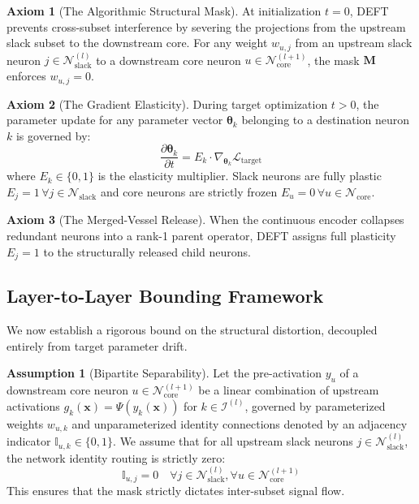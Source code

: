 \documentclass[11pt, a4paper, copyright, gdm]{google}
\newcommand{\xVect}{\boldsymbol{x}}
\newcommand{\thetaVect}{\boldsymbol{\theta}}
\newcommand{\calI}{\mathcal{I}}
\newcommand{\calL}{\mathcal{L}}
\newcommand{\calN}{\mathcal{N}}
\newcommand{\Mmat}{\boldsymbol{M}}
\theoremstyle{definition}
\newtheorem{axiom}{Axiom}
\newtheorem{assumption}{Assumption}
\begin{document}
\begin{axiom}[The Algorithmic Structural Mask]
\label{ax:structural_mask}
At initialization $t=0$, DEFT prevents cross-subset interference by severing the projections from the upstream slack subset to the downstream core. For any weight $w_{u,j}$ from an upstream slack neuron $j \in \calN^{(l)}_{\text{slack}}$ to a downstream core neuron $u \in \calN^{(l+1)}_{\text{core}}$, the mask $\Mmat$ enforces $w_{u,j} = 0$.
\end{axiom}

\begin{axiom}[The Gradient Elasticity]
\label{ax:gradient_scaling}
During target optimization $t>0$, the parameter update for any parameter vector $\thetaVect_k$ belonging to a destination neuron $k$ is governed by:
\begin{equation}
    \frac{\partial \thetaVect_k}{\partial t} = E_k \cdot \nabla_{\thetaVect_k} \calL_{\text{target}}
\end{equation}
where $E_k \in \{0, 1\}$ is the elasticity multiplier. Slack neurons are fully plastic $E_j = 1 \, \forall j \in \calN_{\text{slack}}$ and core neurons are strictly frozen $E_u = 0 \, \forall u \in \calN_{\text{core}}$.
\end{axiom}

\begin{axiom}[The Merged-Vessel Release]
\label{ax:merge_constraint}
When the continuous encoder collapses redundant neurons into a rank-1 parent operator, DEFT assigns full plasticity $E_j = 1$ to the structurally released child neurons.
\end{axiom}

\subsection{Layer-to-Layer Bounding Framework}
We now establish a rigorous bound on the structural distortion, decoupled entirely from target parameter drift.

\begin{assumption}[Bipartite Separability]
\label{assump:topology}
Let the pre-activation $y_u$ of a downstream core neuron $u \in \calN^{(l+1)}_{\text{core}}$ be a linear combination of upstream activations $g_k(\xVect) = \Psi(y_k(\xVect))$ for $k \in \calI^{(l)}$, governed by parameterized weights $w_{u,k}$ and unparameterized identity connections denoted by an adjacency indicator $\mathbb{I}_{u,k} \in \{0, 1\}$. We assume that for all upstream slack neurons $j \in \calN^{(l)}_{\text{slack}}$, the network identity routing is strictly zero:
\begin{equation}
    \mathbb{I}_{u,j} = 0 \quad \forall j \in \calN^{(l)}_{\text{slack}}, \forall u \in \calN^{(l+1)}_{\text{core}}
\end{equation}
This ensures that the mask strictly dictates inter-subset signal flow.
\end{assumption}
\end{document}
